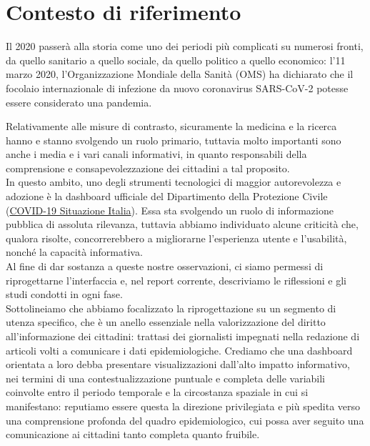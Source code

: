 \documentclass[../../main.tex]{subfiles}
\begin{document}
\section{Contesto di riferimento}
Il 2020 passerà alla storia come uno dei periodi più complicati su numerosi fronti, da quello sanitario a quello sociale, da quello politico a quello economico: l'11 marzo 2020, l'Organizzazione Mondiale della Sanità (OMS) ha dichiarato che il focolaio internazionale di infezione da nuovo coronavirus SARS-CoV-2 potesse essere considerato una pandemia.

Relativamente alle misure di contrasto, sicuramente la medicina e la ricerca hanno e stanno svolgendo un ruolo primario, tuttavia molto importanti sono anche i media e i vari canali informativi, in quanto responsabili della comprensione e consapevolezzazione dei cittadini a tal proposito.\\
In questo ambito, uno degli strumenti tecnologici di maggior autorevolezza e adozione è la dashboard ufficiale del Dipartimento della Protezione Civile (\href{https://opendatadpc.maps.arcgis.com/apps/opsdashboard/index.html#/b0c68bce2cce478eaac82fe38d4138b1}{COVID-19 Situazione Italia}). Essa sta svolgendo un ruolo di informazione pubblica di assoluta rilevanza, tuttavia abbiamo individuato alcune criticità che, qualora risolte, concorrerebbero a migliorarne l'esperienza utente e l'usabilità, nonché la capacità informativa.\\
Al fine di dar sostanza a queste nostre osservazioni, ci siamo permessi di riprogettarne l'interfaccia e, nel report corrente, descriviamo le riflessioni e gli studi condotti in ogni fase.\\
Sottolineiamo che abbiamo focalizzato la riprogettazione su un segmento di utenza specifico, che è un anello essenziale nella valorizzazione del diritto all'informazione dei cittadini: trattasi dei giornalisti impegnati nella redazione di articoli volti a comunicare i dati epidemiologiche.
Crediamo che una dashboard orientata a loro debba presentare visualizzazioni dall'alto impatto informativo, nei termini di una contestualizzazione puntuale e completa delle variabili coinvolte entro il periodo temporale e la circostanza spaziale in cui si manifestano: reputiamo essere questa la direzione privilegiata e più spedita verso una comprensione profonda del quadro epidemiologico, cui possa aver seguito una comunicazione ai cittadini tanto completa quanto fruibile.
\end{document}
